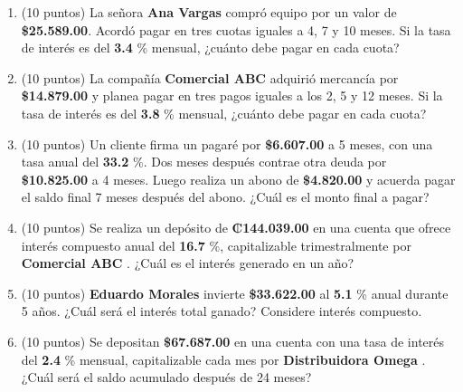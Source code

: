 \documentclass[10pt]{article}
\begin{document}
\begin{enumerate}[leftmargin=*, label=\textbf{\arabic*.}]
  \item (10 puntos) La señora \textbf{ Ana Vargas } compró equipo por un valor de \textbf{\$\num{ 25,589.00 }}. Acordó pagar en tres cuotas iguales a 4, 7 y 10 meses. Si la tasa de interés es del \textbf{ 3.4 }\% mensual, ¿cuánto debe pagar en cada cuota?

  \vspace{0.5cm}

  \item (10 puntos) La compañía \textbf{ Comercial ABC } adquirió mercancía por \textbf{\$\num{ 14,879.00 }} y planea pagar en tres pagos iguales a los 2, 5 y 12 meses. Si la tasa de interés es del \textbf{ 3.8 }\% mensual, ¿cuánto debe pagar en cada cuota?

  \vspace{0.5cm}

  \item (10 puntos) Un cliente firma un pagaré por \textbf{\$\num{ 6,607.00 }} a 5 meses, con una tasa anual del \textbf{ 33.2 }\%. Dos meses después contrae otra deuda por \textbf{\$\num{ 10,825.00 }} a 4 meses. Luego realiza un abono de \textbf{\$\num{ 4,820.00 }} y acuerda pagar el saldo final 7 meses después del abono. ¿Cuál es el monto final a pagar?

  \vspace{0.5cm}

  \item (10 puntos) Se realiza un depósito de \textbf{₡\num{ 144.039.00 }} en una cuenta que ofrece interés compuesto anual del \textbf{ 16.7 }\%, capitalizable trimestralmente por \textbf{ Comercial ABC }. ¿Cuál es el interés generado en un año?

  \vspace{0.5cm}

  \item (10 puntos) \textbf{ Eduardo Morales } invierte \textbf{\$\num{ 33,622.00 }} al \textbf{ 5.1 }\% anual durante 5 años. ¿Cuál será el interés total ganado? Considere interés compuesto.

  \vspace{0.5cm}

  \item (10 puntos) Se depositan \textbf{\$\num{ 67,687.00 }} en una cuenta con una tasa de interés del \textbf{ 2.4 }\% mensual, capitalizable cada mes por \textbf{ Distribuidora Omega }. ¿Cuál será el saldo acumulado después de 24 meses?
\end{enumerate}
\end{document}
